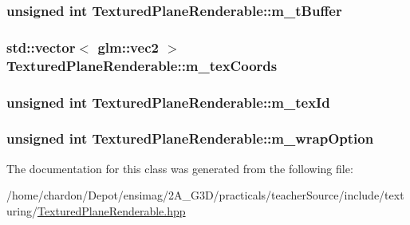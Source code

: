 \hypertarget{classTexturedPlaneRenderable_a1fd262eba65ec9a2ef8fffb3fdf12df9}{
\subsubsection[{m\+\_\+t\+Buffer}]{\setlength{\rightskip}{0pt plus 5cm}unsigned int Textured\+Plane\+Renderable\+::m\+\_\+t\+Buffer\hspace{0.3cm}{\ttfamily [private]}}}\label{classTexturedPlaneRenderable_a1fd262eba65ec9a2ef8fffb3fdf12df9}
\hypertarget{classTexturedPlaneRenderable_adcb8aeecb13c5476b2a3397b9c3526a0}{
\subsubsection[{m\+\_\+tex\+Coords}]{\setlength{\rightskip}{0pt plus 5cm}std\+::vector$<$ glm\+::vec2 $>$ Textured\+Plane\+Renderable\+::m\+\_\+tex\+Coords\hspace{0.3cm}{\ttfamily [private]}}}\label{classTexturedPlaneRenderable_adcb8aeecb13c5476b2a3397b9c3526a0}
\hypertarget{classTexturedPlaneRenderable_af6121c56a3d712bfc2b1c39b5365c6b0}{
\subsubsection[{m\+\_\+tex\+Id}]{\setlength{\rightskip}{0pt plus 5cm}unsigned int Textured\+Plane\+Renderable\+::m\+\_\+tex\+Id\hspace{0.3cm}{\ttfamily [private]}}}\label{classTexturedPlaneRenderable_af6121c56a3d712bfc2b1c39b5365c6b0}
\hypertarget{classTexturedPlaneRenderable_a13d8d7a33df910210f1eb31d91d5785d}{
\subsubsection[{m\+\_\+wrap\+Option}]{\setlength{\rightskip}{0pt plus 5cm}unsigned int Textured\+Plane\+Renderable\+::m\+\_\+wrap\+Option\hspace{0.3cm}{\ttfamily [private]}}}\label{classTexturedPlaneRenderable_a13d8d7a33df910210f1eb31d91d5785d}


The documentation for this class was generated from the following file\+:\begin{DoxyCompactItemize}
\item 
/home/chardon/\+Depot/ensimag/2\+A\+\_\+\+G3\+D/practicals/teacher\+Source/include/texturing/\hyperlink{TexturedPlaneRenderable_8hpp}{Textured\+Plane\+Renderable.\+hpp}\end{DoxyCompactItemize}
